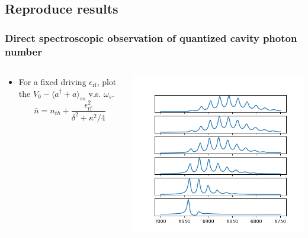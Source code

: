\documentclass[12pt,hyperref={CJKbookmarks=true}]{beamer}
\newcommand{\rf}{\text{rf}}
\begin{document}
\subsection{Reproduce results}
\begin{frame}[t]\frametitle{Direct spectroscopic observation of quantized cavity photon number}
\begin{columns}
\begin{column}{0.4\linewidth}
\begin{itemize}
	\item For a fixed driving $\epsilon_{\rf}$, plot the 
	$V_0 - \langle a^\dag + a\rangle_{ss}$ v.s. $\omega_{s}$. 
	\begin{equation*}
		\bar n = n_{th} + \frac{\epsilon_{\rf}^2}{\delta^2 + \kappa^2/4}
	\end{equation*}
\end{itemize}
\end{column}%
\begin{column}{0.6\linewidth}
	\centering
    \includegraphics[width=\textwidth]{figure/sweaping.png}
\end{column}
\end{columns}
\end{frame}
\end{document}
